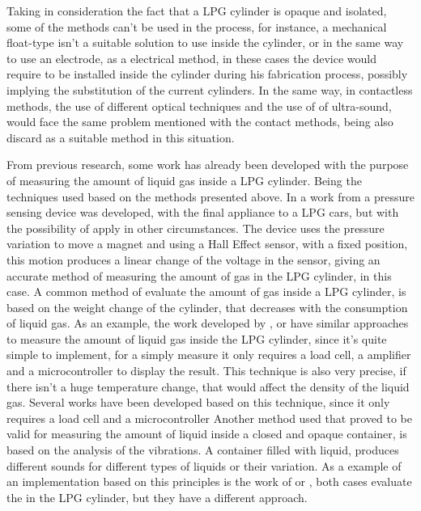 Taking in consideration the fact that a LPG cylinder is opaque and isolated, some of the methods can't be used in the process, for instance, a mechanical float-type isn't a suitable solution to use inside the cylinder, or in the same way to use an electrode, as a electrical method, in these cases the device would require to be installed inside the cylinder during his fabrication process, possibly implying the substitution of the current cylinders. In the same way, in contactless methods, the use of different optical techniques and the use of of ultra-sound, would face the same problem mentioned with the contact methods, being also discard as a suitable method in this situation. 

From previous research, some work has already been developed with the purpose of measuring the amount of liquid gas inside a LPG cylinder. Being the techniques used based on the methods presented above.
In a work from \citeauthor{baigAccurateMeasurementPressure2008b} a pressure sensing device was developed, with the final appliance to a LPG cars, but with the possibility of apply in other circumstances. The device uses the pressure variation to move a magnet and using a Hall Effect sensor, with a fixed position, this motion produces a linear change of the voltage in the sensor, giving an accurate method of measuring the amount of gas in the LPG cylinder, in this case\cite{baigAccurateMeasurementPressure2008b}. 
A common method of evaluate the amount of gas inside a LPG cylinder, is based on the weight change of the cylinder, that decreases with the consumption of liquid gas. As an example, the work developed by \citeauthor{dasilvamedeirosSmartgasSmartPlatform2017a}, \citeauthor{shresthaIoTBasedSmart2019a} or \citeauthor{shinganSmartGasCylinder2017a} have similar approaches to measure the amount of liquid gas inside the LPG cylinder, since it's quite simple to implement, for a simply measure it only requires a load cell, a amplifier and a microcontroller to display the result. This technique is also very precise, if there isn't a huge temperature change, that would affect the density of the liquid gas\cite{dasilvamedeirosSmartgasSmartPlatform2017a}\cite{shresthaIoTBasedSmart2019a}\cite{shinganSmartGasCylinder2017a}.
Several works have been developed based on this technique, since it only requires a load cell and a microcontroller
Another method used that proved to be valid for measuring the amount of liquid inside a closed and opaque container, is based on the analysis of the vibrations. A container filled with liquid, produces different sounds for different types of liquids or their variation. As a example of an implementation based on this principles is the work of \citeauthor{jahnLevelSensorFluids2014a} or \citeauthor{wuAnalysisImplementationNoncontact2016a}, both cases evaluate the in the LPG cylinder, but they have a different approach. 

